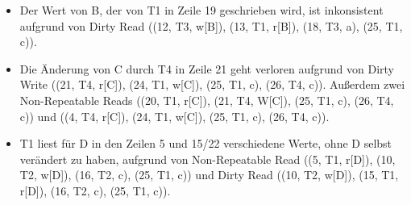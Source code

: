 \begin{solution}
	\begin{itemize}
		\item Der Wert von B, der von T1 in Zeile 19 geschrieben wird, ist inkonsistent aufgrund von Dirty Read ((12, T3, w[B]), (13, T1, r[B]), (18, T3, a), (25, T1, c)).
		\item Die Änderung von C durch T4 in Zeile 21 geht verloren aufgrund von Dirty Write ((21, T4, r[C]), (24, T1, w[C]), (25, T1, c), (26, T4, c)). Außerdem zwei Non-Repeatable Reads ((20, T1, r[C]), (21, T4, W[C]), (25, T1, c), (26, T4, c)) und ((4, T4, r[C]), (24, T1, w[C]), (25, T1, c), (26, T4, c)).
		\item T1 liest für D in den Zeilen 5 und 15/22 verschiedene Werte, ohne D selbst verändert zu haben, aufgrund von Non-Repeatable Read ((5, T1, r[D]), (10, T2, w[D]), (16, T2, c), (25, T1, c)) und Dirty Read ((10, T2, w[D]), (15, T1, r[D]), (16, T2, c), (25, T1, c)).
	\end{itemize}
\end{solution}